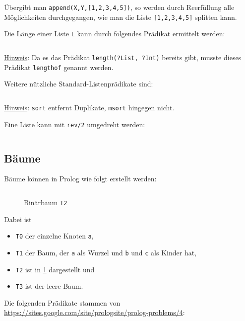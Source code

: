 Übergibt man \texttt{append(X,Y,[1,2,3,4,5])}, so werden durch Reerfüllung alle
Möglichkeiten durchgegangen, wie man die Liste \texttt{[1,2,3,4,5]} splitten kann.

Die Länge einer Liste \texttt{L} kann durch folgendes Prädikat ermittelt werden:%

\inputminted[numbersep=5pt, tabsize=4]{prolog}{scripts/prolog/list-length.pl}

\underline{Hinweis}: Da es das Prädikat \texttt{length(?List, ?Int)} bereits gibt, 
musste dieses Prädikat \texttt{lengthof} genannt werden.

Weitere nützliche Standard-Listenprädikate sind:
\inputminted[numbersep=5pt, tabsize=4]{prolog}{scripts/prolog/standard-list-predicates.pl}

\underline{Hinweis}: \texttt{sort} entfernt Duplikate, \texttt{msort} hingegen nicht.

Eine Liste kann mit \texttt{rev/2} umgedreht werden:
\inputminted[numbersep=5pt, tabsize=4]{prolog}{scripts/prolog/reverse-list.pl}

\subsection{Bäume}
Bäume können in Prolog wie folgt erstellt werden:

\inputminted[numbersep=5pt, tabsize=4]{prolog}{scripts/prolog/binary-tree-example.pl}

\begin{figure}[htp]
    \centering
     
    \caption{Binärbaum \texttt{T2}}
    \label{fig:binary-tree-t2}
\end{figure}

Dabei ist 
\begin{itemize}
    \item \texttt{T0} der einzelne Knoten \texttt{a},
    \item \texttt{T1} der Baum, der \texttt{a} als Wurzel und \texttt{b} und 
          \texttt{c} als Kinder hat,
    \item \texttt{T2} ist in \cref{fig:binary-tree-t2} dargestellt und
    \item \texttt{T3} ist der leere Baum.
\end{itemize}

Die folgenden Prädikate stammen von \url{https://sites.google.com/site/prologsite/prolog-problems/4}:

